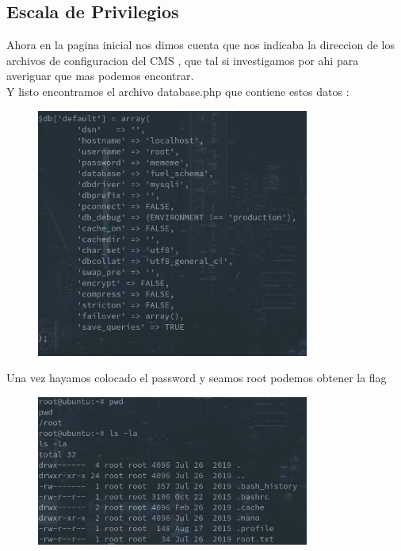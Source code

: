 \documentclass[a4paper]{article}%
\begin{document}
	\subsection{Escala de Privilegios}

	Ahora en la pagina inicial nos dimos cuenta que nos indicaba la
	direccion de los archivos de configuracion del CMS , que tal si
	investigamos por ahi para averiguar que mas podemos encontrar.
	\\
	Y listo encontramos el archivo database.php que contiene estos datos :

	\begin{figure}[h]
   \includegraphics[width=0.8\textwidth]{images/post_ex.jpg}
   \end{figure}
	
	\vspace{0.2cm}
	\newpage
	Una vez hayamos colocado el password y seamos root podemos obtener
	la flag 

	\begin{figure}[h]
   \includegraphics[width=0.8\textwidth]{images/root.jpg}
   \end{figure}
	
	
\end{document}
